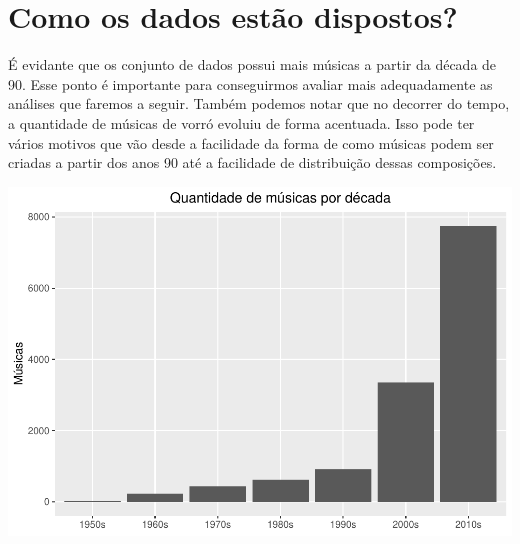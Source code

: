 \documentclass[]{article}
\newenvironment{Shaded}{\begin{snugshade}}{\end{snugshade}}
\newcommand{\DataTypeTok}[1]{\textcolor[rgb]{0.13,0.29,0.53}{#1}}
\newcommand{\FloatTok}[1]{\textcolor[rgb]{0.00,0.00,0.81}{#1}}
\newcommand{\KeywordTok}[1]{\textcolor[rgb]{0.13,0.29,0.53}{\textbf{#1}}}
\newcommand{\NormalTok}[1]{#1}
\newcommand{\OperatorTok}[1]{\textcolor[rgb]{0.81,0.36,0.00}{\textbf{#1}}}
\newcommand{\OtherTok}[1]{\textcolor[rgb]{0.56,0.35,0.01}{#1}}
\newcommand{\StringTok}[1]{\textcolor[rgb]{0.31,0.60,0.02}{#1}}
\begin{document}
\hypertarget{como-os-dados-estao-dispostos}{%
\section{Como os dados estão
dispostos?}\label{como-os-dados-estao-dispostos}}

É evidante que os conjunto de dados possui mais músicas a partir da
década de 90. Esse ponto é importante para conseguirmos avaliar mais
adequadamente as análises que faremos a seguir. Também podemos notar que
no decorrer do tempo, a quantidade de músicas de vorró evoluiu de forma
acentuada. Isso pode ter vários motivos que vão desde a facilidade da
forma de como músicas podem ser criadas a partir dos anos 90 até a
facilidade de distribuição dessas composições.

\begin{Shaded}
\end{Shaded}

\includegraphics{avaliacaoLetrasDeForro_files/figure-latex/unnamed-chunk-4-1.pdf}
\end{document}
